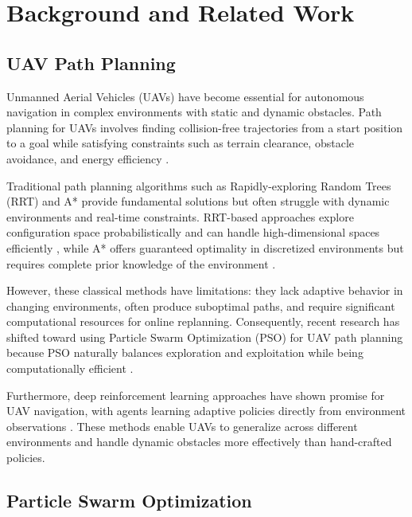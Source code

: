 \section*{Background and Related Work}
\label{sec:background}

\subsection*{UAV Path Planning}
\label{subsec:uav_path_planning}

Unmanned Aerial Vehicles (UAVs) have become essential for autonomous navigation in complex environments with static and dynamic obstacles. Path planning for UAVs involves finding collision-free trajectories from a start position to a goal while satisfying constraints such as terrain clearance, obstacle avoidance, and energy efficiency \cite{Aggarwal2023, Zhang2023}.

Traditional path planning algorithms such as Rapidly-exploring Random Trees (RRT) and A* provide fundamental solutions but often struggle with dynamic environments and real-time constraints. RRT-based approaches explore configuration space probabilistically and can handle high-dimensional spaces efficiently \cite{Lavalle1998}, while A* offers guaranteed optimality in discretized environments but requires complete prior knowledge of the environment \cite{Hart1968}.

However, these classical methods have limitations: they lack adaptive behavior in changing environments, often produce suboptimal paths, and require significant computational resources for online replanning. Consequently, recent research has shifted toward using Particle Swarm Optimization (PSO) for UAV path planning because PSO naturally balances exploration and exploitation while being computationally efficient \cite{Bonyadi2015, Kennedy1995}.

Furthermore, deep reinforcement learning approaches have shown promise for UAV navigation, with agents learning adaptive policies directly from environment observations \cite{Schaal2018, Lillicrap2015}. These methods enable UAVs to generalize across different environments and handle dynamic obstacles more effectively than hand-crafted policies.

\subsection*{Particle Swarm Optimization}
\label{subsec:pso_fundamentals}

